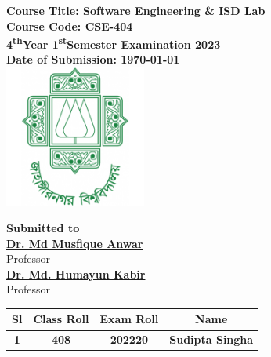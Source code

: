 \documentclass[a4paper,12pt]{article}
\begin{document}
\begin{center}
    \vspace{0.2cm}
    \textbf{\large{Course Title: Software Engineering \& ISD Lab}}\\
    \vspace{0.2cm}
    \textbf{Course Code: CSE-404}\\
    \vspace{0.2cm}
    \textbf{4\textsuperscript{th}Year 1\textsuperscript{st}Semester Examination 2023}\\
    \vspace{0.5cm}
    \textbf{Date of Submission: \today}\\

    \vspace{1.5cm}
    \includegraphics[width=0.35\textwidth]{images/logo.png}\\ %
    \vspace{1cm}

    \textbf{Submitted to}\\
    \vspace{0.2cm}
    \textbf{\href{https://juniv.edu/teachers/musfique.anwar}{Dr. Md Musfique Anwar}}\\
    {Professor}\\
    \vspace{0.2cm}
    \textbf{\href{https://juniv.edu/teachers/hkabir}{Dr. Md. Humayun Kabir}}\\
    {Professor}\\


    \vspace{1cm}

    \begin{table}[h!]
        \centering
        \begin{tabular}{|c|c|c|c|}
            \hline
            \rowcolor[HTML]{2F4F4F} %
            {\color[HTML]{FFFFFF}\textbf{Sl}}& {\color[HTML]{FFFFFF}\textbf{Class Roll}}& {\color[HTML]{FFFFFF}\textbf{Exam Roll}}& {\color[HTML]{FFFFFF}\textbf{Name}}\\ \hline
            \rowcolor[HTML]{B0E0E6}
            \textbf{1}& \textbf{408} & \textbf{202220} & \textbf{Sudipta Singha} \\ \hline
       

\end{tabular}
\end{table}
\end{center}
\end{document}
